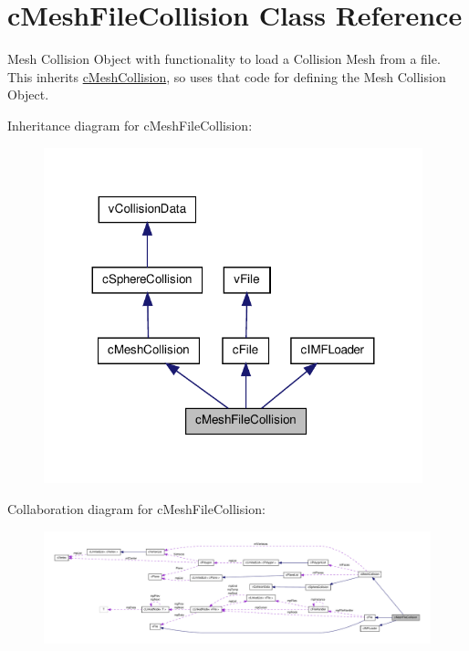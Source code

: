 \hypertarget{classc_mesh_file_collision}{
\section{cMeshFileCollision Class Reference}
\label{classc_mesh_file_collision}
}


Mesh Collision Object with functionality to load a Collision Mesh from a file. This inherits \hyperlink{classc_mesh_collision}{cMeshCollision}, so uses that code for defining the Mesh Collision Object.  




Inheritance diagram for cMeshFileCollision:
\nopagebreak
\begin{figure}[H]
\begin{center}
\leavevmode
\includegraphics[width=311pt]{classc_mesh_file_collision__inherit__graph}
\end{center}
\end{figure}


Collaboration diagram for cMeshFileCollision:
\nopagebreak
\begin{figure}[H]
\begin{center}
\leavevmode
\includegraphics[width=400pt]{classc_mesh_file_collision__coll__graph}
\end{center}
\end{figure}
